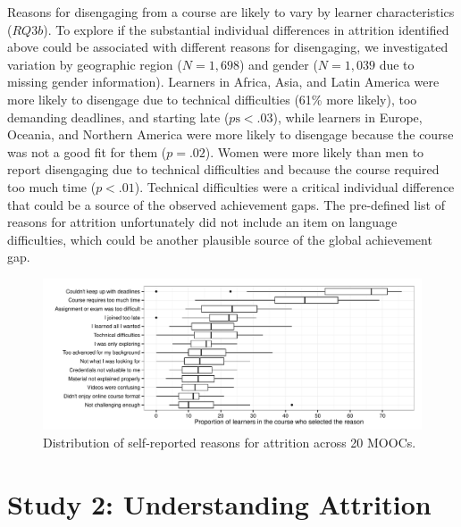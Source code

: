 \documentclass{sigchi}\usepackage[]{graphicx}\usepackage[]{color}
\makeatletter
\def\maxwidth{ %
  \ifdim\Gin@nat@width>\linewidth
    \linewidth
  \else
    \Gin@nat@width
  \fi
}
\newenvironment{knitrout}{}{} %
\makeatother
\begin{document}
Reasons for disengaging from a course are likely to vary by learner characteristics ($RQ3b$). To explore if the substantial individual differences in attrition identified above could be associated with different reasons for disengaging, we investigated variation by geographic region ($N = 1,698$) and gender ($N = 1,039$ due to missing gender information). Learners in Africa, Asia, and Latin America were more likely to disengage due to technical difficulties (61\% more likely), too demanding deadlines, and starting late ($p\text{s} < .03$), while learners in Europe, Oceania, and Northern America were more likely to disengage because the course was not a good fit for them ($p=.02$). Women were more likely than men to report disengaging due to technical difficulties and because the course required too much time ($p<.01$). Technical difficulties were a critical individual difference that could be a source of the observed achievement gaps. The pre-defined list of reasons for attrition unfortunately did not include an item on language difficulties, which could be another plausible source of the global achievement gap.


\begin{knitrout}
\color{fgcolor}\begin{figure}[ht]

\includegraphics[width=\maxwidth]{figure/s1reason} \caption[Distribution of self-reported reasons for attrition across 20 MOOCs]{Distribution of self-reported reasons for attrition across 20 MOOCs.\label{fig:s1reason}}
\end{figure}


\end{knitrout}


\section{Study 2: Understanding Attrition}
\end{document}
